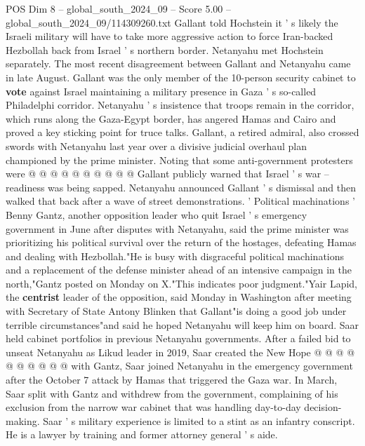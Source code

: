 \begin{textsample}{POS Dim 8 – global\_south\_2024\_09 – Score 5.00 – global\_south\_2024\_09/114309260.txt}
Gallant told Hochstein it ' s likely the Israeli military will have to take more aggressive action to force Iran-backed Hezbollah back from Israel ' s northern border.
Netanyahu met Hochstein separately.
The most recent disagreement between Gallant and Netanyahu came in late August.
Gallant was the only member of the 10-person security cabinet to \textbf{vote} against Israel maintaining a military presence in Gaza ' s so-called Philadelphi corridor.
Netanyahu ' s insistence that troops remain in the corridor, which runs along the Gaza-Egypt border, has angered Hamas and Cairo and proved a key sticking point for truce talks.
Gallant, a retired admiral, also crossed swords with Netanyahu last year over a divisive judicial overhaul plan championed by the prime minister.
Noting that some anti-government protesters were @ @ @ @ @ @ @ @ @ @ Gallant publicly warned that Israel ' s war -- readiness was being sapped.
Netanyahu announced Gallant ' s dismissal and then walked that back after a wave of street demonstrations. ' Political machinations ' Benny Gantz, another opposition leader who quit Israel ' s emergency government in June after disputes with Netanyahu, said the prime minister was prioritizing his political survival over the return of the hostages, defeating Hamas and dealing with Hezbollah."He is busy with disgraceful political machinations and a replacement of the defense minister ahead of an intensive campaign in the north,"Gantz posted on Monday on X."This indicates poor judgment."Yair Lapid, the \textbf{centrist} leader of the opposition, said Monday in Washington after meeting with Secretary of State Antony Blinken that Gallant"is doing a good job under terrible circumstances"and said he hoped Netanyahu will keep him on board.
Saar held cabinet portfolios in previous Netanyahu governments.
After a failed bid to unseat Netanyahu as Likud leader in 2019, Saar created the New Hope @ @ @ @ @ @ @ @ @ @ with Gantz, Saar joined Netanyahu in the emergency government after the October 7 attack by Hamas that triggered the Gaza war.
In March, Saar split with Gantz and withdrew from the government, complaining of his exclusion from the narrow war cabinet that was handling day-to-day decision-making.
Saar ' s military experience is limited to a stint as an infantry conscript.
He is a lawyer by training and former attorney general ' s aide.

\end{textsample}
